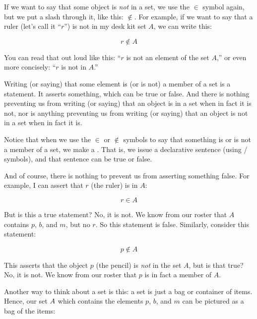 \documentclass[../../../main.tex]{subfiles}
\begin{document}
If we want to say that some object is \emph{not} in a set, we use the $\in$ symbol again, but we put a slash through it, like this: $\not \in$. For example, if we want to say that a ruler (let's call it ``$r$'') is not in my desk kit set $A$, we can write this:

\begin{equation*}
  r \not \in A
\end{equation*}

You can read that out loud like this: ``$r$ is not an element of the set $A$,'' or even more concisely: ``$r$ is not in $A$.''

\begin{aside}
  \begin{remark}
    Writing (or saying) that some element is (or is not) a member of a set is a statement. It asserts something, which can be true or false. And there is nothing preventing us from writing (or saying) that an object is in a set when in fact it is not, nor is anything preventing us from writing (or saying) that an object is not in a set when in fact it is. 
  \end{remark}
\end{aside}

Notice that when we use the $\in$ or $\not \in$ symbols to say that something is or is not a member of a set, we make a . That is, we issue a declarative sentence (using \mathical/ symbols), and that sentence can be true or false.

And of course, there is nothing to prevent us from asserting something false. For example, I can assert that $r$ (the ruler) is in $A$:

\begin{equation*}
  r \in A
\end{equation*}

But is this a true statement? No, it is not. We know from our roster that $A$ contains $p$, $b$, and $m$, but no $r$. So this statement is false. Similarly, consider this statement:

\begin{equation*}
  p \not \in A
\end{equation*}

This asserts that the object $p$ (the pencil) is \emph{not} in the set $A$, but is that true? No, it is not. We know from our roster that $p$ is in fact a member of $A$.

Another way to think about a set is this: a set is just a bag or container of items. Hence, our set $A$ which contains the elements $p$, $b$, and $m$ can be pictured as a bag of the items:
\end{document}
